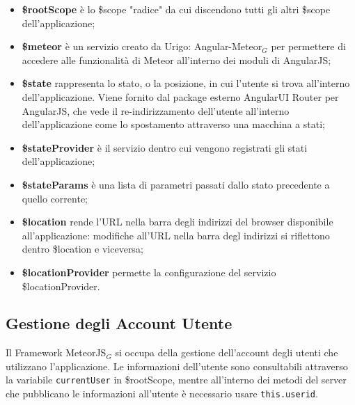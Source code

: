 \begin{itemize}
\item \textbf{\$rootScope} è lo \$scope "radice" da cui discendono tutti gli altri \$scope dell'applicazione;
\item \textbf{\$meteor} è un servizio creato da Urigo: Angular-Meteor$_G$ per permettere di accedere alle funzionalità di Meteor all'interno dei moduli di AngularJS;
\item \textbf{\$state} rappresenta lo stato, o la posizione, in cui l'utente si trova all'interno dell'applicazione. Viene fornito dal package esterno AngularUI Router per AngularJS, che vede il re-indirizzamento dell'utente all'interno dell'applicazione come lo spostamento attraverso una macchina a stati;
\item \textbf{\$stateProvider} è il servizio dentro cui vengono registrati gli stati dell'applicazione;
\item \textbf{\$stateParams} è una lista di parametri passati dallo stato precedente a quello corrente;
\item \textbf{\$location} rende l'URL nella barra degli indirizzi del browser disponibile all'applicazione: modifiche all'URL nella barra degl indirizzi si riflettono dentro \$location e viceversa;
\item \textbf{\$locationProvider} permette la configurazione del servizio \$locationProvider.

\end{itemize}

\subsection{Gestione degli Account Utente}
Il Framework MeteorJS$_G$ si occupa della gestione dell'account degli utenti che utilizzano l'applicazione. Le informazioni dell'utente sono consultabili attraverso la variabile \texttt{currentUser}  in \$rootScope, mentre all'interno dei metodi del server che pubblicano le informazioni all'utente è necessario usare \texttt{this.userid}.
